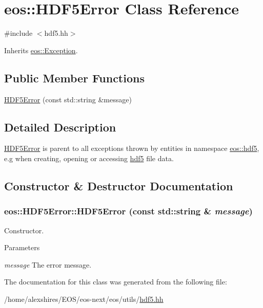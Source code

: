 \hypertarget{classeos_1_1HDF5Error}{
\section{eos::HDF5Error Class Reference}
\label{classeos_1_1HDF5Error}
}


{\ttfamily \#include $<$hdf5.hh$>$}

Inherits \hyperlink{classeos_1_1Exception}{eos::Exception}.\subsection*{Public Member Functions}
\begin{DoxyCompactItemize}
\item 
\hyperlink{classeos_1_1HDF5Error_af32e08e06b9bedbe31e760574b1d6f7a}{HDF5Error} (const std::string \&message)
\end{DoxyCompactItemize}


\subsection{Detailed Description}
\hyperlink{classeos_1_1HDF5Error}{HDF5Error} is parent to all exceptions thrown by entities in namespace \hyperlink{namespaceeos_1_1hdf5}{eos::hdf5}, e.g when creating, opening or accessing \hyperlink{namespaceeos_1_1hdf5}{hdf5} file data. 

\subsection{Constructor \& Destructor Documentation}
\hypertarget{classeos_1_1HDF5Error_af32e08e06b9bedbe31e760574b1d6f7a}{
\subsubsection[{HDF5Error}]{\setlength{\rightskip}{0pt plus 5cm}eos::HDF5Error::HDF5Error (const std::string \& {\em message})}}
\label{classeos_1_1HDF5Error_af32e08e06b9bedbe31e760574b1d6f7a}
Constructor.


\begin{DoxyParams}{Parameters}
\item[{\em message}]The error message. \end{DoxyParams}


The documentation for this class was generated from the following file:\begin{DoxyCompactItemize}
\item 
/home/alexshires/EOS/eos-\/next/eos/utils/\hyperlink{hdf5_8hh}{hdf5.hh}\end{DoxyCompactItemize}
